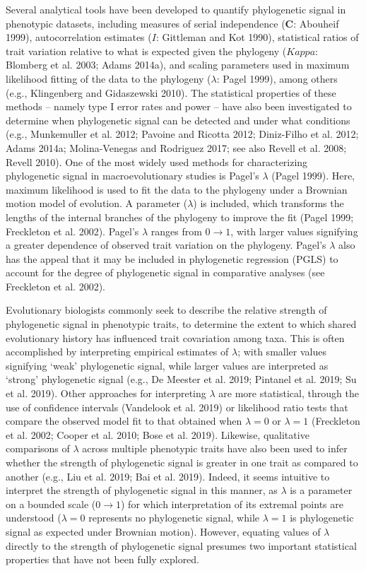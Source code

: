 \documentclass[
]{article}
\begin{document}
Several analytical tools have been developed to quantify phylogenetic
signal in phenotypic datasets, including measures of serial independence
(\(\mathbf{C}\): Abouheif 1999), autocorrelation estimates (\(I\):
Gittleman and Kot 1990), statistical ratios of trait variation relative
to what is expected given the phylogeny (\(Kappa\): Blomberg et al.
2003; Adams 2014a), and scaling parameters used in maximum likelihood
fitting of the data to the phylogeny (\(\lambda\): Pagel 1999), among
others (e.g., Klingenberg and Gidaszewski 2010). The statistical
properties of these methods -- namely type I error rates and power --
have also been investigated to determine when phylogenetic signal can be
detected and under what conditions (e.g., Munkemuller et al. 2012;
Pavoine and Ricotta 2012; Diniz-Filho et al. 2012; Adams 2014a;
Molina-Venegas and Rodriguez 2017; see also Revell et al. 2008; Revell
2010). One of the most widely used methods for characterizing
phylogenetic signal in macroevolutionary studies is Pagel's \(\lambda\)
(Pagel 1999). Here, maximum likelihood is used to fit the data to the
phylogeny under a Brownian motion model of evolution. A parameter
(\(\lambda\)) is included, which transforms the lengths of the internal
branches of the phylogeny to improve the fit (Pagel 1999; Freckleton et
al. 2002). Pagel's \(\lambda\) ranges from \(0\to1\), with larger values
signifying a greater dependence of observed trait variation on the
phylogeny. Pagel's \(\lambda\) also has the appeal that it may be
included in phylogenetic regression (PGLS) to account for the degree of
phylogenetic signal in comparative analyses (see Freckleton et al.
2002). \hfill\break

Evolutionary biologists commonly seek to describe the relative strength
of phylogenetic signal in phenotypic traits, to determine the extent to
which shared evolutionary history has influenced trait covariation among
taxa. This is often accomplished by interpreting empirical estimates of
\(\lambda\); with smaller values signifying `weak' phylogenetic signal,
while larger values are interpreted as `strong' phylogenetic signal
(e.g., De Meester et al. 2019; Pintanel et al. 2019; Su et al. 2019).
Other approaches for interpreting \(\lambda\) are more statistical,
through the use of confidence intervals (Vandelook et al. 2019) or
likelihood ratio tests that compare the observed model fit to that
obtained when \(\lambda=0\) or \(\lambda=1\) (Freckleton et al. 2002;
Cooper et al. 2010; Bose et al. 2019). Likewise, qualitative comparisons
of \(\lambda\) across multiple phenotypic traits have also been used to
infer whether the strength of phylogenetic signal is greater in one
trait as compared to another (e.g., Liu et al. 2019; Bai et al. 2019).
Indeed, it seems intuitive to interpret the strength of phylogenetic
signal in this manner, as \(\lambda\) is a parameter on a bounded scale
(\(0\to1\)) for which interpretation of its extremal points are
understood (\(\lambda=0\) represents no phylogenetic signal, while
\(\lambda=1\) is phylogenetic signal as expected under Brownian motion).
However, equating values of \(\lambda\) directly to the strength of
phylogenetic signal presumes two important statistical properties that
have not been fully explored. \hfill\break
\end{document}
